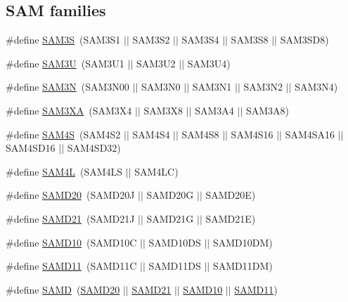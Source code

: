 \subsection*{S\-A\-M families}
\begin{DoxyCompactItemize}
\item 
\#define \hyperlink{group__sam__part__macros__group_gaaa8d9ee5981c67997fbdf923247bcb68}{S\-A\-M3\-S}~(S\-A\-M3\-S1 $|$$|$ S\-A\-M3\-S2 $|$$|$ S\-A\-M3\-S4 $|$$|$ S\-A\-M3\-S8 $|$$|$ S\-A\-M3\-S\-D8)
\item 
\#define \hyperlink{group__sam__part__macros__group_ga987abac1ef39b0b447b8b11419942476}{S\-A\-M3\-U}~(S\-A\-M3\-U1 $|$$|$ S\-A\-M3\-U2 $|$$|$ S\-A\-M3\-U4)
\item 
\#define \hyperlink{group__sam__part__macros__group_ga52239420b96aa3f1a273665cfd3b60a1}{S\-A\-M3\-N}~(S\-A\-M3\-N00 $|$$|$ S\-A\-M3\-N0 $|$$|$ S\-A\-M3\-N1 $|$$|$ S\-A\-M3\-N2 $|$$|$ S\-A\-M3\-N4)
\item 
\#define \hyperlink{group__sam__part__macros__group_gaae4990dfaa4eeed17d8a0351cca02fdd}{S\-A\-M3\-X\-A}~(S\-A\-M3\-X4 $|$$|$ S\-A\-M3\-X8 $|$$|$ S\-A\-M3\-A4 $|$$|$ S\-A\-M3\-A8)
\item 
\#define \hyperlink{group__sam__part__macros__group_gac3e6ef71bec5113415a64bb14ce8be24}{S\-A\-M4\-S}~(S\-A\-M4\-S2 $|$$|$ S\-A\-M4\-S4 $|$$|$ S\-A\-M4\-S8 $|$$|$ S\-A\-M4\-S16 $|$$|$ S\-A\-M4\-S\-A16 $|$$|$ S\-A\-M4\-S\-D16 $|$$|$ S\-A\-M4\-S\-D32)
\item 
\#define \hyperlink{group__sam__part__macros__group_gabf4b4fa802cbb57480225dd3c8f7a41b}{S\-A\-M4\-L}~(S\-A\-M4\-L\-S $|$$|$ S\-A\-M4\-L\-C)
\item 
\#define \hyperlink{group__sam__part__macros__group_gad9193543e761f5967353a0464dde1e61}{S\-A\-M\-D20}~(S\-A\-M\-D20\-J $|$$|$ S\-A\-M\-D20\-G $|$$|$ S\-A\-M\-D20\-E)
\item 
\#define \hyperlink{group__sam__part__macros__group_gab9217b15071242235d3014381d61dbf7}{S\-A\-M\-D21}~(S\-A\-M\-D21\-J $|$$|$ S\-A\-M\-D21\-G $|$$|$ S\-A\-M\-D21\-E)
\item 
\#define \hyperlink{group__sam__part__macros__group_gac83f6794433f2c57bfc5c520fe3d67ce}{S\-A\-M\-D10}~(S\-A\-M\-D10\-C $|$$|$ S\-A\-M\-D10\-D\-S $|$$|$ S\-A\-M\-D10\-D\-M)
\item 
\#define \hyperlink{group__sam__part__macros__group_ga9e5edb5637174377186d92141e7f60d9}{S\-A\-M\-D11}~(S\-A\-M\-D11\-C $|$$|$ S\-A\-M\-D11\-D\-S $|$$|$ S\-A\-M\-D11\-D\-M)
\item 
\#define \hyperlink{group__sam__part__macros__group_ga5eed5c828e076621e5274450cdc6c32b}{S\-A\-M\-D}~(\hyperlink{group__sam__part__macros__group_gad9193543e761f5967353a0464dde1e61}{S\-A\-M\-D20} $|$$|$ \hyperlink{group__sam__part__macros__group_gab9217b15071242235d3014381d61dbf7}{S\-A\-M\-D21} $|$$|$ \hyperlink{group__sam__part__macros__group_gac83f6794433f2c57bfc5c520fe3d67ce}{S\-A\-M\-D10} $|$$|$ \hyperlink{group__sam__part__macros__group_ga9e5edb5637174377186d92141e7f60d9}{S\-A\-M\-D11})
$$
\end{DoxyCompactItemize}

